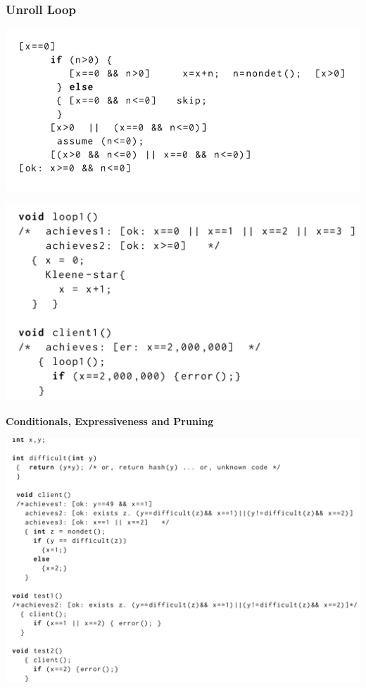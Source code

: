 \documentclass[11pt]{beamer}
\begin{document}
\begin{frame}\frametitle{Unroll Loop}

\begin{center}

\includegraphics[scale=0.4]{11.PNG}
\end{center}
\begin{center}

\includegraphics[scale=0.25]{12.PNG}
\end{center}


\end{frame}

\begin{frame}
\textbf{Conditionals, Expressiveness and Pruning}
\begin{center}

\includegraphics[scale = 0.34]{13.PNG}
\end{center}
\end{frame}
\end{document}
